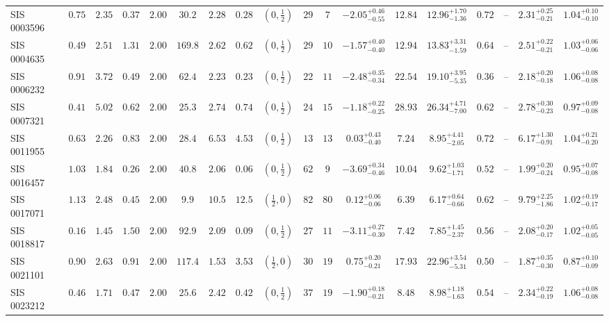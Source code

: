 \begin{longtable}{@{}lccccccccccccccccc@{}}
SIS 0003596 & $0.75$ & $2.35$ & $0.37$ & $2.00$ & $30.2$ & $2.28$ & $0.28$ & $(0,\frac12)$ & $29$ & $7$ & $-2.05^{+0.46}_{-0.55}$ & $12.84$ & $12.96^{+1.70}_{-1.36}$ & $0.72$ & -- & $2.31^{+0.25}_{-0.21}$ & $1.04^{+0.10}_{-0.10}$\\
SIS 0004635 & $0.49$ & $2.51$ & $1.31$ & $2.00$ & $169.8$ & $2.62$ & $0.62$ & $(0,\frac12)$ & $29$ & $10$ & $-1.57^{+0.40}_{-0.40}$ & $12.94$ & $13.83^{+3.31}_{-1.59}$ & $0.64$ & -- & $2.51^{+0.22}_{-0.21}$ & $1.03^{+0.06}_{-0.06}$\\
SIS 0006232 & $0.91$ & $3.72$ & $0.49$ & $2.00$ & $62.4$ & $2.23$ & $0.23$ & $(0,\frac12)$ & $22$ & $11$ & $-2.48^{+0.35}_{-0.34}$ & $22.54$ & $19.10^{+3.95}_{-5.35}$ & $0.36$ & -- & $2.18^{+0.20}_{-0.18}$ & $1.06^{+0.08}_{-0.08}$\\
SIS 0007321 & $0.41$ & $5.02$ & $0.62$ & $2.00$ & $25.3$ & $2.74$ & $0.74$ & $(0,\frac12)$ & $24$ & $15$ & $-1.18^{+0.22}_{-0.25}$ & $28.93$ & $26.34^{+4.71}_{-7.00}$ & $0.62$ & -- & $2.78^{+0.30}_{-0.23}$ & $0.97^{+0.09}_{-0.08}$\\
SIS 0011955 & $0.63$ & $2.26$ & $0.83$ & $2.00$ & $28.4$ & $6.53$ & $4.53$ & $(0,\frac12)$ & $13$ & $13$ & $0.03^{+0.43}_{-0.40}$ & $7.24$ & $8.95^{+4.41}_{-2.05}$ & $0.72$ & -- & $6.17^{+1.30}_{-0.91}$ & $1.04^{+0.21}_{-0.20}$\\
SIS 0016457 & $1.03$ & $1.84$ & $0.26$ & $2.00$ & $40.8$ & $2.06$ & $0.06$ & $(0,\frac12)$ & $62$ & $9$ & $-3.69^{+0.34}_{-0.46}$ & $10.04$ & $9.62^{+1.03}_{-1.71}$ & $0.52$ & -- & $1.99^{+0.20}_{-0.24}$ & $0.95^{+0.07}_{-0.08}$\\
SIS 0017071 & $1.13$ & $2.48$ & $0.45$ & $2.00$ & $9.9$ & $10.5$ & $12.5$ & $(\frac12,0)$ & $82$ & $80$ & $0.12^{+0.06}_{-0.06}$ & $6.39$ & $6.17^{+0.64}_{-0.66}$ & $0.62$ & -- & $9.79^{+2.25}_{-1.86}$ & $1.02^{+0.19}_{-0.17}$\\
SIS 0018817 & $0.16$ & $1.45$ & $1.50$ & $2.00$ & $92.9$ & $2.09$ & $0.09$ & $(0,\frac12)$ & $27$ & $11$ & $-3.11^{+0.27}_{-0.30}$ & $7.42$ & $7.85^{+1.45}_{-2.37}$ & $0.56$ & -- & $2.08^{+0.20}_{-0.17}$ & $1.02^{+0.05}_{-0.05}$\\
SIS 0021101 & $0.90$ & $2.63$ & $0.91$ & $2.00$ & $117.4$ & $1.53$ & $3.53$ & $(\frac12,0)$ & $30$ & $19$ & $0.75^{+0.20}_{-0.21}$ & $17.93$ & $22.96^{+3.54}_{-5.31}$ & $0.50$ & -- & $1.87^{+0.35}_{-0.30}$ & $0.87^{+0.10}_{-0.09}$\\
SIS 0023212 & $0.46$ & $1.71$ & $0.47$ & $2.00$ & $25.6$ & $2.42$ & $0.42$ & $(0,\frac12)$ & $37$ & $19$ & $-1.90^{+0.18}_{-0.21}$ & $8.48$ & $8.98^{+1.18}_{-1.63}$ & $0.54$ & -- & $2.34^{+0.22}_{-0.19}$ & $1.06^{+0.08}_{-0.08}$\\

\end{longtable}
